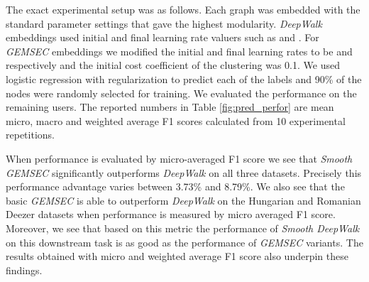 The exact experimental setup was as follows. Each graph was embedded with the standard parameter settings that gave the highest modularity. \textit{DeepWalk} embeddings used initial and final learning rate valuers such as  and . For \textit{GEMSEC} embeddings we modified the initial and final learning rates to be  and  respectively and the initial cost coefficient of the clustering was 0.1. We used logistic regression with  regularization to predict each of the labels and 90\% of the nodes were randomly selected for training. We evaluated the performance on the remaining users. The reported numbers in Table \ref{fig:pred_perfor} are mean micro, macro and weighted average F1 scores calculated from 10 experimental repetitions.

When performance is evaluated by micro-averaged F1 score we see that \textit{Smooth GEMSEC} significantly outperforms \textit{DeepWalk} on all three datasets. Precisely this performance advantage varies between 3.73\% and 8.79\%. We also see that the basic \textit{GEMSEC} is able to outperform \textit{DeepWalk} on the Hungarian and Romanian Deezer datasets when performance is measured by micro averaged F1 score. Moreover, we see that based on this metric the performance of \textit{Smooth DeepWalk} on this downstream task is as good as the performance of \textit{GEMSEC} variants. The results obtained with micro and weighted average F1 score also underpin these findings.

